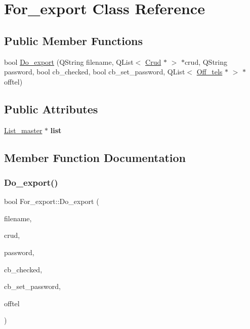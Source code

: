 \hypertarget{class_for__export}{}\section{For\+\_\+export Class Reference}
\label{class_for__export}
\subsection*{Public Member Functions}
\begin{DoxyCompactItemize}
\item 
bool \mbox{\hyperlink{class_for__export_a25dfff7206aedb130de8c825c17bc993}{Do\+\_\+export}} (Q\+String filename, Q\+List$<$ \mbox{\hyperlink{class_crud}{Crud}} $\ast$ $>$ $\ast$crud, Q\+String password, bool cb\+\_\+checked, bool cb\+\_\+set\+\_\+password, Q\+List$<$ \mbox{\hyperlink{class_off__tels}{Off\+\_\+tels}} $\ast$ $>$ $\ast$offtel)
\end{DoxyCompactItemize}
\subsection*{Public Attributes}
\begin{DoxyCompactItemize}
\item 
\mbox{\label{class_for__export_ab82c9abeee9f3a0a41923ff668db09cc}} 
\mbox{\hyperlink{class_list__master}{List\+\_\+master}} $\ast$ {\bfseries list}
\end{DoxyCompactItemize}


\subsection{Member Function Documentation}
\mbox{\label{class_for__export_a25dfff7206aedb130de8c825c17bc993}} 
\subsubsection{\texorpdfstring{Do\_export()}{Do\_export()}}
{\footnotesize\ttfamily bool For\+\_\+export\+::\+Do\+\_\+export (\begin{DoxyParamCaption}\item[{Q\+String}]{filename,  }\item[{Q\+List$<$ \mbox{\hyperlink{class_crud}{Crud}} $\ast$ $>$ $\ast$}]{crud,  }\item[{Q\+String}]{password,  }\item[{bool}]{cb\+\_\+checked,  }\item[{bool}]{cb\+\_\+set\+\_\+password,  }\item[{Q\+List$<$ \mbox{\hyperlink{class_off__tels}{Off\+\_\+tels}} $\ast$ $>$ $\ast$}]{offtel }\end{DoxyParamCaption})}

